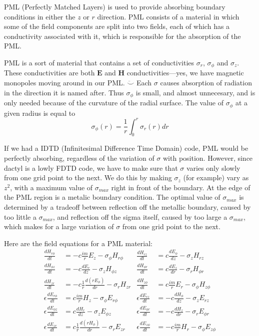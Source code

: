 \documentclass[floats]{report}
\begin{document}
PML (Perfectly Matched Layers) is used to provide absorbing boundary
conditions in either the $z$ or $r$ direction.  PML consists of a material
in which some of the field components are split into two fields, each of
which has a conductivity associated with it, which is responsible for the
absorption of the PML.

PML is a sort of material that contains a set of conductivities $\sigma_r$,
$\sigma_\phi$ and $\sigma_z$.  These conductivities are both $\mathbf{E}$
and $\mathbf{H}$ conductivities---yes, we have magnetic monopoles moving
around in our PML.  $\ddot\smile$ Each $\sigma$ causes absorption of
radiation in the direction it is named after.  Thus $\sigma_\phi$ is small,
and almost unnecesary, and is only needed because of the curvature of the
radial surface.  The value of $\sigma_\phi$ at a given radius is equal to
\begin{equation}
\sigma_\phi(r) = \frac1r \int_0^r \sigma_r(r)dr
\end{equation}

If we had a IDTD (Infinitesimal Difference Time Domain) code, PML would be
perfectly absorbing, regardless of the variation of $\sigma$ with position.
However, since dactyl is a lowly FDTD code, we have to make sure that
$\sigma$ varies only slowly from one grid point to the next.  We do this by
making $\sigma_z$ (for example) vary as $z^2$, with a maximum value of
$\sigma_{max}$ right in front of the boundary.  At the edge of the PML
region is a metalic boundary condition.  The optimal value of
$\sigma_{max}$ is determined by a tradeoff between reflection off the
metallic boundary, caused by too little a $\sigma_{max}$, and reflection
off the sigma itself, caused by too large a $\sigma_{max}$, which makes for
a large variation of $\sigma$ from one grid point to the next.

Here are the field equations for a PML material:
\begin{align}
\frac{dH_{r\phi}}{dt} &= - c \frac{im}r E_z             - \sigma_\phi H_{r\phi} &
\frac{dH_{rz}}{dt} &= c \frac{dE_\phi}{dz}              - \sigma_z H_{rz}\\
\frac{dH_{\phi z}}{dt} &= - c \frac{dE_r}{dz}           - \sigma_z H_{\phi z} &
\frac{dH_{\phi r}}{dt} &= c \frac{dE_z}{dr}             - \sigma_r H_{\phi r} \\
\frac{dH_{zr}}{dt} &= - c \frac1r\frac{d(rE_\phi)}{dr}  - \sigma_r H_{zr}  &
\frac{dH_{z\phi}}{dt} &= c \frac{im}r E_r               - \sigma_\phi H_{z\phi} \\
\epsilon\frac{dE_{r\phi}}{dt} &=   c \frac{im}r H_z             - \sigma_\phi E_{r\phi} &
\epsilon\frac{dE_{rz}}{dt} &= -c\frac{dH_\phi}{dz}              - \sigma_z E_{rz}\\
\epsilon\frac{dE_{\phi z}}{dt} &=   c \frac{dH_r}{dz}           - \sigma_z E_{\phi z} &
\epsilon\frac{dE_{\phi r}}{dt} &=-c \frac{dH_z}{dr}             - \sigma_r E_{\phi r} \\
\epsilon\frac{dE_{zr}}{dt} &=   c \frac1r\frac{d(rH_\phi)}{dr}  - \sigma_r E_{zr}  &
\epsilon\frac{dE_{z\phi}}{dt} &=-c \frac{im}r H_r               - \sigma_\phi E_{z\phi} 
\end{align}
\end{document}

